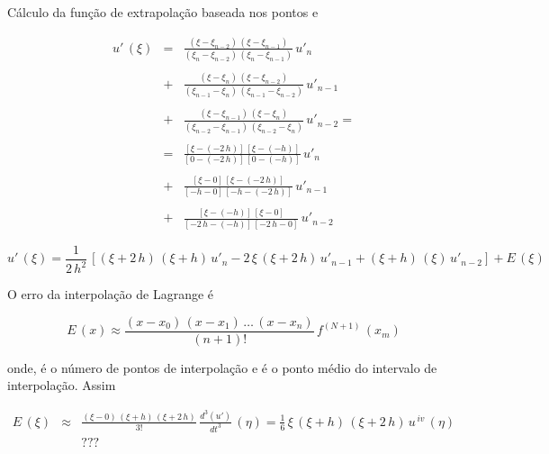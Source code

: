 \begin{enumerar}

\item Cálculo da função de extrapolação  baseada nos pontos  e 

\begin{eqnarray}
 u' \, (\xi) & = & \frac{ (\xi - \xi_{n-2}) \, (\xi - \xi_{n-1}) }{ (\xi_n - \xi_{n-2}) \, (\xi_n - \xi_{n-1}) } \, u'_n \nonumber \\
 \nonumber \\
             & + & \frac{ (\xi - \xi_n) \, (\xi - \xi_{n-2}) }{ (\xi_{n-1} - \xi_n) \, (\xi_{n-1} - \xi_{n-2}) } \, u'_{n-1} \nonumber \\
 \nonumber \\
             & + & \frac{ (\xi - \xi_{n-1}) \, (\xi - \xi_n) }{ (\xi_{n-2} - \xi_{n-1}) \, (\xi_{n-2} - \xi_n) } \, u'_{n-2} = \nonumber \\
 \nonumber \\
             & = & \frac{ [\xi - (-2 \, h)] \, [\xi - (-h)] }{ [0 - (-2 \, h)] \, [0 - (-h)] } \, u'_n \nonumber \\
 \nonumber \\
             & + & \frac{ [\xi - 0] \, [\xi - (-2 \, h)] }{ [-h - 0] \, [-h - (-2 \, h)] } \, u'_{n-1} \nonumber \\
 \nonumber \\
             & + & \frac{ [\xi - (-h)] \, [\xi - 0] }{ [-2 \, h - (-h)] \, [-2 \, h - 0] } \, u'_{n-2} \nonumber
\end{eqnarray}

\begin{equation}
 \label{cap6:sec4:eq4}
 u' \, (\xi) = \frac{1}{2 \, h^2} \, \left[ (\xi + 2 \, h) \, (\xi + h) \, u'_n - 2 \, \xi \, (\xi + 2 \, h) \, u'_{n-1} + (\xi + h) \, (\xi) \, u'_{n-2} \right] + E \, (\xi)
\end{equation}

O erro da interpolação de Lagrange é 

\begin{equation}
 \label{cap6:sec4:eq5}
 E \, (x) \approx \frac{ (x - x_0) \, (x - x_1) \, \ldots \, (x - x_n) }{ (n+1)! } \, f^{(N+1)} \, (x_m)
\end{equation}

onde,  é o número de pontos de interpolação e  é o ponto médio do intervalo de interpolação. Assim

\begin{equation}
 \label{cap6:sec4:eq6}
 \begin{array}{lcr}
  E \, (\xi) & \approx & \displaystyle \frac{ (\xi - 0) \, (\xi + h) \, (\xi + 2 \, h) }{ 3! } \, \frac{ d^3(u') }{ dt^3 } \, (\eta) = \frac{1}{6} \, \xi \, (\xi + h) \, (\xi + 2 \, h) \, u^{ \, iv} \, (\eta) \\
  && ???
 \end{array}
\end{equation}


\end{enumerar}
